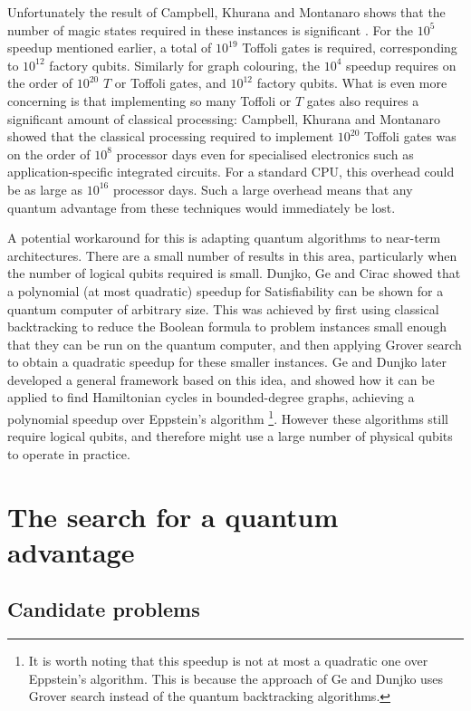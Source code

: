 Unfortunately the result of Campbell, Khurana and Montanaro shows that the number of magic states required in these instances is significant \cite{campbell2019}. For the $10^5$ speedup mentioned earlier, a total of $10^{19}$ Toffoli gates is required, corresponding to $10^{12}$ factory qubits. Similarly for graph colouring, the $10^4$ speedup requires on the order of $10^{20}$ $T$ or Toffoli gates, and $10^{12}$ factory qubits. What is even more concerning is that implementing so many Toffoli or $T$ gates also requires a significant amount of classical processing: Campbell, Khurana and Montanaro showed that the classical processing required to implement $10^{20}$ Toffoli gates was on the order of $10^8$ processor days even for specialised electronics such as application-specific integrated circuits. For a standard CPU, this overhead could be as large as $10^{16}$ processor days. Such a large overhead means that any quantum advantage from these techniques would immediately be lost.

A potential workaround for this is adapting quantum algorithms to near-term architectures. There are a small number of results in this area, particularly when the number of logical qubits required is small. Dunjko, Ge and Cirac \cite{dunjko2018} showed that a polynomial (at most quadratic) speedup for Satisfiability can be shown for a quantum computer of arbitrary size. This was achieved by first using classical backtracking to reduce the Boolean formula to problem instances small enough that they can be run on the quantum computer, and then applying Grover search to obtain a quadratic speedup for these smaller instances. Ge and Dunjko \cite{ge2019} later developed a general framework based on this idea, and showed how it can be applied to find Hamiltonian cycles in bounded-degree graphs, achieving a polynomial speedup over Eppstein's algorithm \cite{eppstein2007}\footnote{It is worth noting that this speedup is not at most a quadratic one over Eppstein's algorithm. This is because the approach of Ge and Dunjko uses Grover search instead of the quantum backtracking algorithms.}. However these algorithms still require logical qubits, and therefore might use a large number of physical qubits to operate in practice.

\section{The search for a quantum advantage}

\subsection{Candidate problems}

